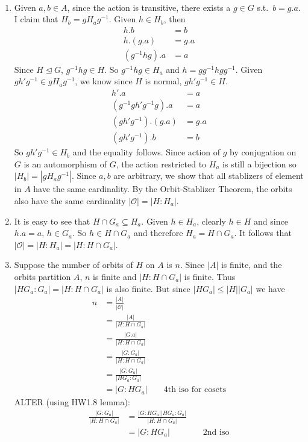 \documentclass[12pt]{article}
\begin{document}
\begin{problem}[3]
~\begin{enumerate}[label=(\alph*)]
	\item Given $ a,b \in A$, since the action is transitive, there exists a $ g \in G$ s.t.\ $ b=g.a$. I claim that $H_b = gH_ag^{-1} $. Given $ h \in H_b$, then
		\begin{align*}
			h.b&= b \\
			h.(g.a)  &= g.a \\
			(g^{-1}hg) .a &= a
		\end{align*}
		Since $ H \trianglelefteq G$, $ g^{-1}hg \in H$. So $ g^{-1} h g \in H_a$ and $ h = g g^{-1} h g g^{-1}$. Given $ g h'g^{-1} \in gH_a g^{-1}$, we know since $ H$ is normal, $ gh'g^{-1} \in H$.
		\begin{align*}
			h'.a &= a \\ 
			(g^{-1} g h'g^{-1} g).a &= a \\
			(gh'g^{-1}).(g.a) &= g.a \\
			(gh'g^{-1}).b &= b
		\end{align*}
		So $ gh'g^{-1} \in H_b$ and the equality follows. Since action of $ g$ by conjugation on $ G$ is an automorphism of $ G$, the action restricted to  $ H_a$ is still a bijection so  $ |H_b| = |gH_ag^{-1}|$. Since $ a,b$ are arbitrary, we show that all stablizers of element in $ A$ have the same cardinality. By the Orbit-Stablizer Theorem, the orbits also have the same cardinality $| \mathcal{ O} |= |H:H_a|$.
	\item It is easy to see that $ H \cap G_a \subseteq H_a$. Given $ h \in H_a$, clearly $ h \in H$ and since $ h.a=a$, $ h \in G_a$. So $ h \in H \cap G_a$ and therefore $ H_a = H \cap G_a$. It follows that $ | \mathcal{ O}| = |H:H_a| = |H:H \cap G_a|$.
\item Suppose the number of orbits of $ H$ on  $ A$ is $ n$. Since $ |A|$ is finite, and the orbits partition  $ A$, $ n$ is finite and  $ |H:H \cap G_a|$ is finite. Thus $ |HG_a: G_a| = |H: H \cap G_a|$ is also finite. But since $ |HG_a| \leq |H||G_a|$ we have
		\begin{align*}
			n &= \frac{|A|}{| \mathcal{ O}| } \\
			&= \frac{|A|}{|H: H \cap G_a| } \\
			&= \frac{|G.a|}{|H: H \cap G_a| } \\
			&= \frac{|G:G_a|}{|H:H \cap G_a| } \\
			&= \frac{|G: G_a|}{|HG_a : G_a| } \\
			&= |G:HG_a| && \text{ 4th iso for cosets} 
		\end{align*}
ALTER (using HW1.8 lemma):
\begin{align*}
	\frac{|G:G_a|}{|H:H \cap G_a| } &= \frac{|G:HG_a||HG_a:G_a|}{|H : H \cap G_a| } \\
					&= |G:HG_a| && \text{ 2nd iso} 
\end{align*}
\end{enumerate}
\end{problem}
\end{document}
